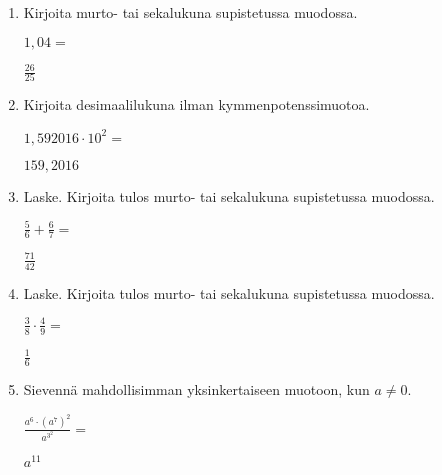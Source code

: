 \documentclass[finnish, a4paper, 12pt]{article}
\begin{document}
	\begin{enumerate}[leftmargin=*]
		\setlength\itemsep{1em}
		
		\item %
		Kirjoita murto- tai sekalukuna supistetussa muodossa. 
		
		\(
		1{,}04 = 
		\) %
		
		\begin{version:withAnswers}
		\( \frac{26}{25} \)
		\end{version:withAnswers}

		\vspace{8pt}
		
		\item %
		Kirjoita desimaalilukuna ilman kymmenpotenssimuotoa. 
		
		\(
		1{,}592016\cdot 10^{2} = 
		\) %
		\begin{version:withAnswers}
		\( 159,2016 \)
		\end{version:withAnswers}	
		\vspace{8pt}
		
		\item %
		Laske. Kirjoita tulos murto- tai sekalukuna supistetussa muodossa.
		
		\(
		\displaystyle
		\frac{5}{6}+\frac{6}{7} = 
		\) %
		\begin{version:withAnswers}
		\( \frac{71}{42} \)
		\end{version:withAnswers}	
		
		\vspace{8pt}
		
		\item %
		Laske. Kirjoita tulos murto- tai sekalukuna supistetussa muodossa.
		
		\(
		\displaystyle
		\frac{3}{8}\cdot\frac{4}{9} = 
		\) %
		\begin{version:withAnswers}
		\( \frac{1}{6} \)
		\end{version:withAnswers}
		
		\vspace{8pt}
		
		\item %
		Sievennä mahdollisimman yksinkertaiseen muotoon, kun \(a \not = 0\). 
		
		\(
		\displaystyle
		\frac{a^6 \cdot \left(a^7\right)^2}{a^{3^2}} =
		\phantom{mmmmmmmmmmmmmmm}
		\) %
		\begin{version:withAnswers}
		\(  a^{11} \)
		\end{version:withAnswers}
		

\end{enumerate}
\end{document}
